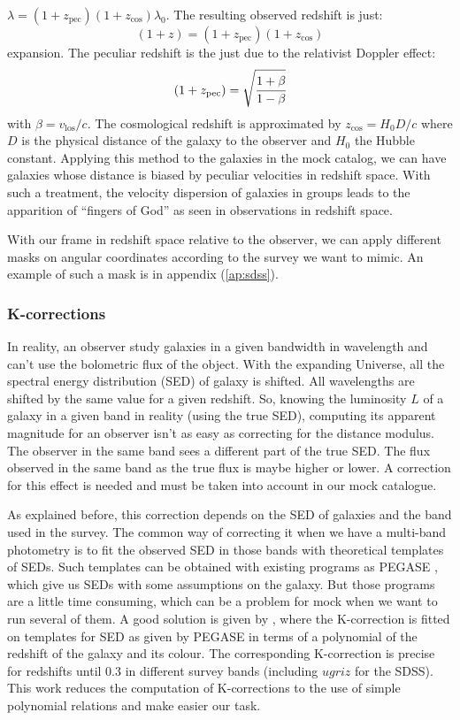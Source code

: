 $\lambda=(1+z_{\mathrm{pec}})(1+z_{\cos})\lambda_0$. The resulting
observed redshift is just:
%
\begin{equation}
    (1+z)=(1+z_{\mathrm{pec}})(1+z_{\cos})
\end{equation}
%
expansion. The peculiar redshift is the just due to the relativist Doppler
effect:
%
\begin{equation}
    (1+z_{\mathrm{pec}})=\sqrt{\cfrac{1+\beta}{1-\beta}}
\end{equation}
%
with $\beta={v_{\mathrm{los}}}/{c}$. The cosmological redshift is approximated
by $z_{\cos}={H_0}{D}/c$ where $D$ is the physical distance of the
galaxy to the observer and $H_0$ the Hubble constant. Applying this
method to the galaxies in the mock catalog, we can have galaxies whose distance
is biased by peculiar velocities in redshift space. With such a treatment, the
velocity dispersion of galaxies in groups leads to the apparition of ``fingers
of God'' as seen in observations in redshift space.

With our frame in redshift space relative to the observer, we can apply
different masks on angular coordinates according to the survey we want to
mimic. An example of such a mask is in appendix (\ref{ap:sdss}).
%
\subsubsection{K-corrections}
%
In reality, an observer study galaxies in a given bandwidth in wavelength and
can't use the bolometric flux of the object. With the expanding Universe, all
the spectral energy distribution (SED) of galaxy is shifted. All wavelengths
are shifted by the same value for a given redshift. So, knowing the luminosity
$L$ of a galaxy in a given band in reality (using the true SED), computing its
apparent magnitude for an observer isn't as easy as correcting for the distance
modulus. The observer in the same band sees a different part of the true SED\@.
The flux observed in the same band as the true flux is maybe higher or lower. A
correction for this effect is needed and must be taken into account in our mock
catalogue.

As explained before, this correction depends on the SED of galaxies and the
band used in the survey. The common way of correcting it when we have a
multi-band photometry is to fit the observed SED in those bands with
theoretical templates of SEDs. Such templates can be obtained with existing
programs as PEGASE , which give us SEDs with some
assumptions on the galaxy. But those programs are a little time consuming,
which can be a problem for mock when we want to run several of them. A good
solution is given by \citet{Chilingarian+10}, where the K-correction is fitted on
templates for SED as given by PEGASE in terms of a polynomial of the redshift
of the galaxy and its colour. The corresponding K-correction is precise for
redshifts until 0.3 in different survey bands (including $ugriz$ for the SDSS).
This work reduces the computation of K-corrections to the use of simple
polynomial relations and make easier our task.

